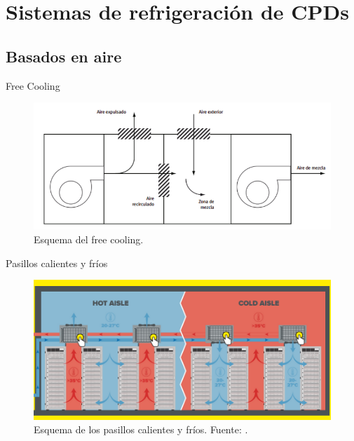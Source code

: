 \documentclass[aspectratio=169, compress]{beamer}
\begin{document}
\section{Sistemas de refrigeración de CPDs}

\subsection{Basados en aire}

\begin{frame}{Free Cooling}
    \begin{figure}
        \begin{center}
            \includegraphics[scale=0.7]{../figures/free_cooling}
            \caption{Esquema del free cooling.}
            \label{free_coling}
        \end{center}
    \end{figure}
\end{frame}

\begin{frame}{Pasillos calientes y fríos}
    \begin{figure}
        \begin{center}
            \includegraphics[scale=0.6]{../figures/pasillos}
            \caption{Esquema de los pasillos calientes y fríos. Fuente: \cite{Kelvion}.}
            \label{pasillos}
        \end{center}
    \end{figure}
\end{frame}
\end{document}

